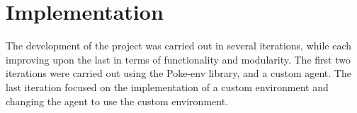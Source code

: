 \chapter{Implementation}
\label{chap:implementation}

The development of the project was carried out in several iterations, while each 
improving upon the last in terms of functionality and modularity.
The first two iterations were carried out using the Poke-env library, and a 
custom agent. The last iteration focused on the implementation of a custom 
environment and changing the agent to use the custom environment.





